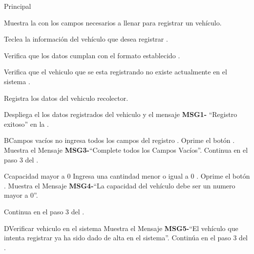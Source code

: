 \begin{UCtrayectoria}{Principal}

	\UCpaso Muestra la  con los campos necesarios a llenar para registrar un vehículo.
	
	\UCpaso[\UCactor] Teclea la información del vehículo que desea registrar  \label{CU17SeleccionarSeminario}.
	
	\UCpaso Verifica que  los datos cumplan con el formato establecido  .
	
	
	\UCpaso Verifica que el vehiculo que se esta registrando no existe actualmente en el sistema  .
	
	\UCpaso Registra los datos del vehiculo recolector.
	
	\UCpaso Despliega el los datos registrados del vehiculo y  el mensaje
	 {\bf MSG1-} ``Registro exitoso'' en la .
	
	
\end{UCtrayectoria}
	
	\begin{UCtrayectoriaA}{B}{Campos vacíos}
	\UCpaso [\UCactor] no ingresa  todos los campos del registro .
	\UCpaso[\UCactor] Oprime el botón .
	\UCpaso Muestra el Mensaje {\bf MSG3-}``Complete todos  los Campos Vacíos''.
	\UCpaso Continua en el paso 3 del .
\end{UCtrayectoriaA}

\begin{UCtrayectoriaA}{C}{capacidad mayor a 0}
	\UCpaso [\UCactor] Ingresa una cantindad menor o igual a 0 .
	\UCpaso[\UCactor] Oprime el botón .
	\UCpaso Muestra el Mensaje {\bf MSG4-}``La capacidad del vehículo debe ser un numero mayor a 0''.

	\UCpaso Continua en el paso 3 del .
\end{UCtrayectoriaA}

\begin{UCtrayectoriaA}{D}{Verificar vehiculo en el sistema}
	\UCpaso Muestra el Mensaje {\bf MSG5-}``El vehículo que intenta registrar ya ha sido dado de alta en el sistema''.
	\UCpaso Continúa en el paso 3 del .
\end{UCtrayectoriaA}
		
